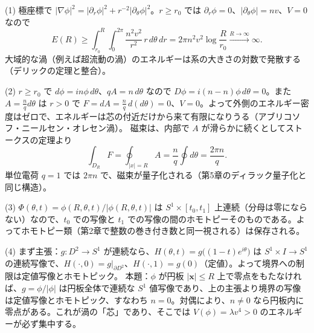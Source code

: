 \begin{solution}
(1) 極座標で $\lvert\nabla\phi\rvert^2=\lvert\partial_r\phi\rvert^2+r^{-2}\lvert\partial_\theta\phi\rvert^2$。$r\ge r_0$ では $\partial_r\phi=0$、$\lvert\partial_\theta\phi\rvert=n v$、$V=0$ なので
\[
E(R)\ge\int_{r_0}^R\!\!\int_0^{2\pi}\frac{n^2v^2}{r^2}\,r\,d\theta\,dr=2\pi n^2v^2\log\frac{R}{r_0}\xrightarrow{R\to\infty}\infty .
\]
大域的な渦（例えば超流動の渦）のエネルギーは系の大きさの対数で発散する（デリックの定理と整合）。

(2) $r\ge r_0$ で $d\phi=in\phi\,d\theta$、$qA=n\,d\theta$ なので $D\phi=i(n-n)\phi\,d\theta=0$。また $A=\tfrac nq d\theta$ は $r>0$ で $F=dA=\tfrac nq\,d(d\theta)=0$、$V=0$。よって外側のエネルギー密度はゼロで、エネルギーは芯の付近だけから来て有限になりうる（アブリコソフ・ニールセン・オレセン渦）。
磁束は、内部で $A$ が滑らかに続くとしてストークスの定理より
\[
\int_{D_R}F=\oint_{\lvert x\rvert=R}A=\frac nq\oint d\theta=\frac{2\pi n}{q}.
\]
単位電荷 $q=1$ では $2\pi n$ で、磁束が量子化される（第5章のディラック量子化と同じ構造）。

(3) $\Phi(\theta,t)=\phi(R,\theta,t)/\lvert\phi(R,\theta,t)\rvert$ は $S^1\times[t_0,t_1]$ 上連続（分母は零にならない）なので、$t_0$ での写像と $t_1$ での写像の間のホモトピーそのものである。よってホモトピー類（第2章で整数の巻き付き数と同一視される）は保存される。

(4) まず主張：$g\colon D^2\to S^1$ が連続なら、$H(\theta,t)=g\bigl((1-t)e^{i\theta}\bigr)$ は $S^1\times I\to S^1$ の連続写像で、$H(\cdot,0)=g|_{\partial D^2}$、$H(\cdot,1)=g(0)$（定値）。よって境界への制限は定値写像とホモトピック。
本題：$\phi$ が円板 $\lvert\bm x\rvert\le R$ 上で零点をもたなければ、$g=\phi/\lvert\phi\rvert$ は円板全体で連続な $S^1$ 値写像であり、上の主張より境界の写像は定値写像とホモトピック、すなわち $n=0$。対偶により、$n\neq0$ なら円板内に零点がある。これが渦の「芯」であり、そこでは $V(\phi)=\lambda v^4>0$ のエネルギーが必ず集中する。
\end{solution}

